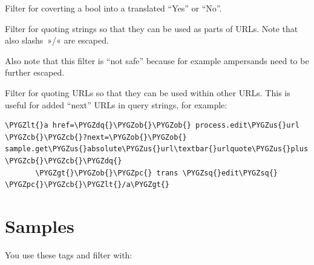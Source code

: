 \documentclass[a4paper,11pt,english]{sphinxmanual}
\def\PYGZus{\char`\_}
\def\PYGZob{\char`\{}
\def\PYGZcb{\char`\}}
\def\PYGZlt{\char`\<}
\def\PYGZgt{\char`\>}
\def\PYGZpc{\char`\%}
\def\PYGZsq{\char`\'}
\def\PYGZdq{\char`\"}
\begin{document}

\begin{fulllineitems}
\label{programming/template_tags_and_filters:jb_common.templatetags.juliabase.fancy_bool}
Filter for coverting a bool into a translated “Yes” or “No”.

\end{fulllineitems}


\begin{fulllineitems}
\label{programming/template_tags_and_filters:jb_common.templatetags.juliabase.urlquote}
Filter for quoting strings so that they can be used as parts of URLs.
Note that also slashs »/« are escaped.

Also note that this filter is “not safe” because for example ampersands
need to be further escaped.

\end{fulllineitems}


\begin{fulllineitems}
\label{programming/template_tags_and_filters:jb_common.templatetags.juliabase.urlquote_plus}
Filter for quoting URLs so that they can be used within other URLs.
This is useful for added “next” URLs in query strings, for example:

\begin{Verbatim}[commandchars=\\\{\},formatcom=\scriptsize]
\PYGZlt{}a href=\PYGZdq{}\PYGZob{}\PYGZob{} process.edit\PYGZus{}url \PYGZcb{}\PYGZcb{}?next=\PYGZob{}\PYGZob{} sample.get\PYGZus{}absolute\PYGZus{}url\textbar{}urlquote\PYGZus{}plus \PYGZcb{}\PYGZcb{}\PYGZdq{}
       \PYGZgt{}\PYGZob{}\PYGZpc{} trans \PYGZsq{}edit\PYGZsq{} \PYGZpc{}\PYGZcb{}\PYGZlt{}/a\PYGZgt{}
\end{Verbatim}

\end{fulllineitems}



\section{Samples}
\label{programming/template_tags_and_filters:samples}
You use these tags and filter with:
\end{document}
